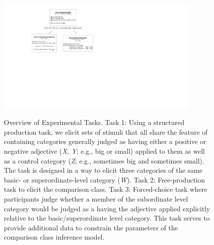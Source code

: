 \documentclass[doc]{apa6}
\begin{document}


\begin{figure}[htb]
{\centering \includegraphics[width=0.9\textwidth]{figs/expt_overview} }
\caption{\small Overview of Experimental Tasks. Task 1: Using a structured production task, we elicit sets of stimuli that all share the feature of containing categories generally judged as having either a positive or negative adjective  (\emph{X, Y}; e.g., big or small) applied to them as well as a control category (\emph{Z}; e.g., sometimes big and sometimes small). The task is designed in a way to elicit three categories of the same basic- or superordinate-level category (\emph{W}). Task 2: Free-production task to elicit the comparison class. Task 3: Forced-choice task where participants judge whether a member of the subordinate level category would be judged as a having the adjective applied explicitly relative to the basic/superordinate level category. This task serves to provide additional data to constrain the parameters of the comparison class inference model. }\label{fig:exptOverview}
\end{figure}






%
%
%
\end{document}
